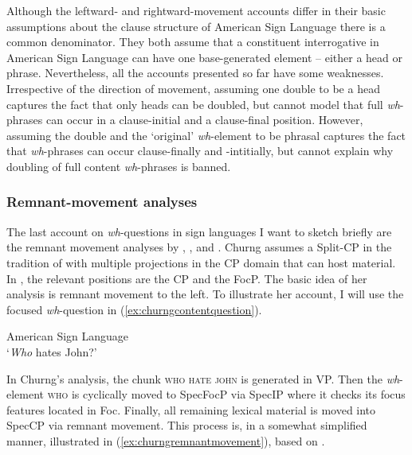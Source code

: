 \noindent Although the leftward- and rightward-movement accounts differ in their basic assumptions about the clause structure of American Sign Language there is a common denominator. They both assume that a constituent interrogative in American Sign Language can have one base-generated element -- either a head or phrase. Nevertheless, all the accounts presented so far have some weaknesses. Irrespective of the direction of movement, assuming one double to be a head captures the fact that only heads can be doubled, but cannot model that full \textit{wh}-phrases can occur in a clause-initial and a clause-final position. However, assuming the double and the `original' \textit{wh}-element to be phrasal captures the fact that \textit{wh}-phrases can occur clause-finally and -intitially, but cannot explain why doubling of full content \textit{wh}-phrases is banned.

\subsubsection{Remnant-movement analyses}

The last account on \textit{wh}-questions in sign languages I want to sketch briefly are the remnant movement analyses by \citet{churng2006synchronizing, churng2007double, churng2009syntax}, \citet{sarac2007cross}, and \citet{aboh2010sa}. Churng assumes a Split-CP in the tradition of \citet{rizzi1997fine} with multiple projections in the CP domain that can host material. In \citet{churng2009syntax}, the relevant positions are the CP and the FocP. The basic idea of her analysis is remnant movement to the left. To illustrate her account, I will use the focused \textit{wh}-question in (\ref{ex:churngcontentquestion}).

\begin{exe}
\ex American Sign Language \citep[39]{churng2009syntax} \\ 
\glt `\textit{Who} hates John?' \label{ex:churngcontentquestion}
\end{exe}

\noindent In Churng's analysis, the chunk \textsc{who hate john} is generated in VP. Then the \textit{wh}-element \textsc{who} is cyclically moved to SpecFocP via SpecIP where it checks its focus features located in Foc\textdegree . Finally, all remaining lexical material is moved into SpecCP via remnant movement. This process is, in a somewhat simplified manner, illustrated in (\ref{ex:churngremnantmovement}), based on \citet[38]{churng2009syntax}.



